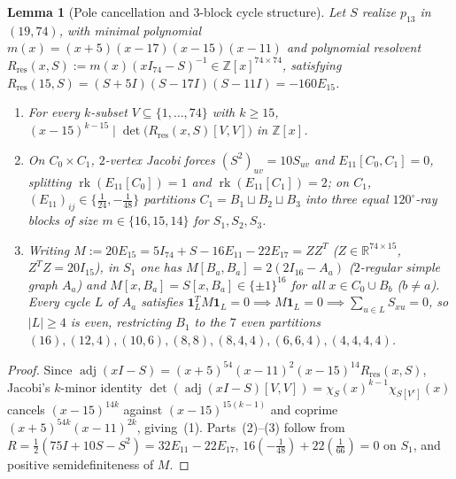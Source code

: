 \documentclass[11pt,reqno]{amsart}
\newtheorem{lemma}[theorem]{Lemma}
\theoremstyle{definition}
\theoremstyle{remark}
\DeclareMathOperator{\rk}{rk}
\DeclareMathOperator{\adj}{adj}
\begin{document}
\begin{lemma}[Pole cancellation and $3$-block cycle structure]\label{lem:idx13_resolvent}
Let $S$ realize $p_{13}$ in $(19, 74)$, with minimal polynomial $m(x) = (x+5)(x-17)(x-15)(x-11)$ and polynomial resolvent $R_{\mathrm{res}}(x, S) := m(x)(xI_{74} - S)^{-1} \in \mathbb{Z}[x]^{74 \times 74}$, satisfying $R_{\mathrm{res}}(15, S) = (S+5I)(S-17I)(S-11I) = -160 E_{15}$.
\begin{enumerate}
  \item For every $k$-subset $V \subseteq \{1,\dots,74\}$ with $k \ge 15$, $(x - 15)^{k - 15} \mid \det\big(R_{\mathrm{res}}(x, S)[V, V]\big)$ in $\mathbb{Z}[x]$.
  \item On $C_0 \times C_1$, $2$-vertex Jacobi forces $(S^2)_{uv} = 10 S_{uv}$ and $E_{11}[C_0, C_1] = 0$, splitting $\rk(E_{11}[C_0]) = 1$ and $\rk(E_{11}[C_1]) = 2$; on $C_1$, $(E_{11})_{ij} \in \{\frac{1}{24}, -\frac{1}{48}\}$ partitions $C_1 = B_1 \sqcup B_2 \sqcup B_3$ into three equal $120^\circ$-ray blocks of size $m \in \{16, 15, 14\}$ for $S_1, S_2, S_3$.
  \item Writing $M := 20 E_{15} = 5I_{74} + S - 16 E_{11} - 22 E_{17} = Z Z^T$ ($Z \in \mathbb{R}^{74 \times 15}$, $Z^T Z = 20 I_{15}$), in $S_1$ one has $M[B_a, B_a] = 2(2I_{16} - A_a)$ ($2$-regular simple graph $A_a$) and $M[x, B_a] = S[x, B_a] \in \{\pm 1\}^{16}$ for all $x \in C_0 \cup B_b$ ($b \neq a$). Every cycle $L$ of $A_a$ satisfies $\mathbf{1}_L^T M \mathbf{1}_L = 0 \implies M\mathbf{1}_L = 0 \implies \sum_{u \in L} S_{xu} = 0$, so $|L| \ge 4$ is even, restricting $B_1$ to the $7$ even partitions $(16), (12,4), (10,6), (8,8), (8,4,4), (6,6,4), (4,4,4,4)$.
\end{enumerate}
\end{lemma}

\begin{proof}
Since $\adj(xI - S) = (x+5)^{54}(x-11)^2(x-15)^{14} R_{\mathrm{res}}(x, S)$, Jacobi's $k$-minor identity $\det(\adj(xI-S)[V,V]) = \chi_S(x)^{k-1}\chi_{S[V^c]}(x)$ cancels $(x-15)^{14k}$ against $(x-15)^{15(k-1)}$ and coprime $(x+5)^{54k}(x-11)^{2k}$, giving~(1). Parts~(2)--(3) follow from $R = \frac{1}{2}(75I + 10S - S^2) = 32E_{11} - 22E_{17}$, $16(-\frac{1}{48}) + 22(\frac{1}{66}) = 0$ on $S_1$, and positive semidefiniteness of $M$.
\end{proof}
\end{document}
